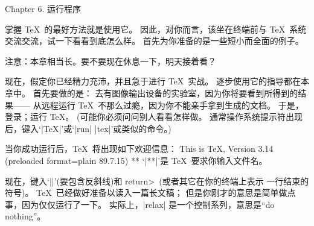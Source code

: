 


\beginchapter Chapter 6. 运行程序


\1掌握 \TeX\ 的最好方法就是使用它。%
因此，对你而言，该坐在终端前与 \TeX\ 系统交流交流，试一下看看到底怎么样。%
首先为你准备的是一些短小而全面的例子。

注意：本章相当长。要不要现在休息一下，明天接着看？

\smallskip
现在，假定你已经精力充沛，并且急于进行 \TeX\ 实战。%
逐步使用它的指导都在本章中。%
首先要做的是：
去有图像输出设备的实验室，因为你将要看到所得到的结果——%
从远程运行 \TeX\ 不那么过瘾，因为你不能亲手拿到生成的文档。%
于是，登录；运行 \TeX。%
(可能你必须问问别人看看怎样做。%
通常操作系统提示符出现后，键入`|TeX|'或`|run| |tex|'或类似的命令。)

当你成功运行后，\TeX\ 将出现如下欢迎信息：
\begintt
This is TeX, Version 3.14 (preloaded format=plain 89.7.15)
**
\endtt
`|**|'是 \TeX\ 要求你输入文件名。

现在，键入`|\relax|'(要包含反斜线)和 \<return>~(或者其它在你的终端上表示%
一行结束的符\hbox{号)。}%
\TeX\ 已经做好准备以读入一篇长文稿；
但是你刚才的意思是简单做点事，因为仅仅运行了一下。%
实际上，|relax| 是一个控制系列，意思是``do nothing''。

